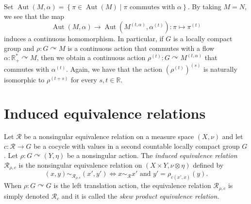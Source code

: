 \documentclass[a4paper,11pt]{amsart}
\numberwithin{equation}{section}
\theoremstyle{definition}
\newcommand{\R}{\mathbb{R}}
\newcommand{\Aut}{\operatorname{Aut}}
\newcommand{\cR}{\mathcal{R}}
\begin{document}
Set $\Aut(M, \alpha) =\left\{\pi \in \Aut(M) \mid \pi \text{ commutes with } \alpha\right\}$. By taking $M=N$, we see that the map 
$$\Aut(M,\alpha)\to \Aut(M^{(t,\alpha)},\alpha^{(t)}) : \pi \mapsto \pi^{(t)}$$ 
induces a continuous homomorphism.
In particular, if $G$ is a locally compact group and $\rho : G \curvearrowright M$ is a continuous action that commutes with a flow $\alpha : \R^*_+ \curvearrowright M$, then we obtain a continuous action $\rho^{(t)} : G\curvearrowright M^{(t,\alpha)}$ that commutes with $\alpha^{(t)}$. Again, we have that the action $(\rho^{(t)})^{(s)}$ is naturally isomorphic to $\rho^{(t+s)}$ for every $s,t \in \R$.







\section{Induced equivalence relations}
Let $\cR$ be a nonsingular equivalence relation on a measure space $(X,\nu)$ and let $c : \cR \rightarrow G$ be a cocycle with values in a second countable locally compact group $G$. Let $\rho : G \curvearrowright (Y,\eta)$ be a nonsingular action. The \emph{induced equivalence relation} $\cR_{\rho,c}$ is the nonsingular equivalence relation on $(X \times Y, \nu \otimes \eta)$ defined by
$$ (x,y) \sim_{\cR_{\rho, c}} (x',y') \Longleftrightarrow x \sim_{\cR} x' \text{ and } y' = \rho_{c(x',x)}(y).$$
When $\rho : G \curvearrowright G$ is the left translation action, the equivalence relation $\cR_{\rho,c}$ is simply denoted $\cR_{c}$ and it is called the \emph{skew product equivalence relation}.
\end{document}
